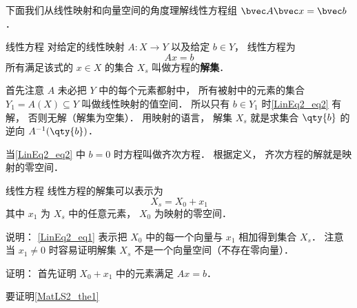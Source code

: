 

下面我们从线性映射和向量空间的角度理解线性方程组 $\bvec A \bvec x = \bvec b$．


\begin{definition}{线性方程}
对给定的线性映射 $A:X\to Y$ 以及给定 $b \in Y$， 线性方程为
\begin{equation}\label{LinEq2_eq2}
Ax = b
\end{equation}
所有满足该式的 $x \in X$ 的集合 $X_s$ 叫做方程的\textbf{解集}．
\end{definition}

首先注意 $A$ 未必把 $Y$ 中的每个元素都射中， 所有被射中的元素的集合 $Y_1 = A(X) \subseteq Y$ 叫做线性映射的值空间． 所以只有 $b \in Y_1$ 时\autoref{LinEq2_eq2} 有解， 否则无解（解集为空集）． 用映射的语言， 解集 $X_s$ 就是求集合 $\qty{b}$ 的逆向 $A^{-1}(\qty{b})$．

当\autoref{LinEq2_eq2} 中 $b = 0$ 时方程叫做齐次方程． 根据定义， 齐次方程的解就是映射的零空间．

\begin{theorem}{线性方程}
线性方程的解集可以表示为
\begin{equation}\label{LinEq2_eq1}
X_s = X_0 + x_1
\end{equation}
其中 $x_1$ 为 $X_s$ 中的任意元素，  $X_0$ 为映射的零空间．
\end{theorem}
说明： \autoref{LinEq2_eq1} 表示把 $X_0$ 中的每一个向量与 $x_1$ 相加得到集合 $X_s$． 注意当 $x_1 \ne 0$ 时容易证明解集 $X_s$ 不是一个向量空间（不存在零向量）．

证明： 首先证明 $X_0 + x_1$ 中的元素满足 $Ax = b$．

要证明\autoref{MatLS2_the1}~
